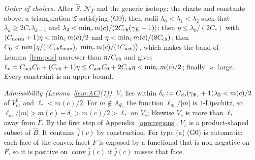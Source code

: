 \emph{Order of choices.} After $\hat S$, $\mathcal N_\Gamma$ and the generic isotopy: the charts and constants above; a triangulation $\mathfrak T$ satisfying (G0); then radii $\lambda_0<\lambda_1<\lambda_2$ such that $\lambda_k\ge2C_*\lambda_{k-1}$ and $\lambda_2<\min_cm(c)/(2C_{\rm ch}(\gamma_E+1))$; then $\eta\le\lambda_0/(2C_*)$ with $(C_{\rm norm}+1)\eta<\min_cm(c)/2$ and $\eta<\min_cm(c)/(8C_{\rm ch})$; then $C_0<\min\bigl(\eta/(4C_{\rm ch}t_{\max}),\ \min_cm(c)/(4C_{\rm act})\bigr)$, which makes the band of Lemma~\ref{lem:pos} narrower than $\eta/C_{\rm ch}$ and gives $\ell_*=C_{\rm act}C_0+(C_{\rm ch}+1)\eta\le C_{\rm act}C_0+2C_{\rm ch}\eta<\min_cm(c)/2$; finally $\varkappa$ large. Every constraint is an upper bound.

\emph{Admissibility (Lemma~\ref{lem:AC}(1)).} $V_c$ lies within $\delta_c:=C_{\rm ch}(\gamma_{\Phi_c}+1)\lambda_2<m(c)/2$ of $V^0_c$, and $\ell_*<m(c)/2$. For $m\notin A_{\Phi_c}$ the function $\ell_m/|m|$ is $1$-Lipschitz, so $\ell_m/|m|>m(c)-\delta_c>m(c)/2>\ell_*$ on $V_c$; likewise $V_c$ is more than $\ell_*$ away from $\widehat\Gamma$. By the first step of Appendix~\ref{app:regions}, $V_c$ is a product-shaped subset of $\widehat B$. It contains $\hat j(c)$ by construction. For type (a) (G0) is automatic: each face of the convex facet $F$ is exposed by a functional that is non-negative on $F$, so it is positive on $\operatorname{conv}\hat j(c)$ if $\hat j(c)$ misses that face.

